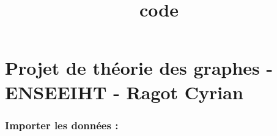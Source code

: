 \documentclass[11pt]{article}
\title{code}
\begin{document}
    
    \maketitle
    
    

    
    \section{Projet de théorie des graphes - ENSEEIHT - Ragot Cyrian}\label{projet-de-thuxe9orie-des-graphes---enseeiht---ragot-cyrian}

\subsubsection{Importer les données :}\label{importer-les-donnuxe9es}
\end{document}

